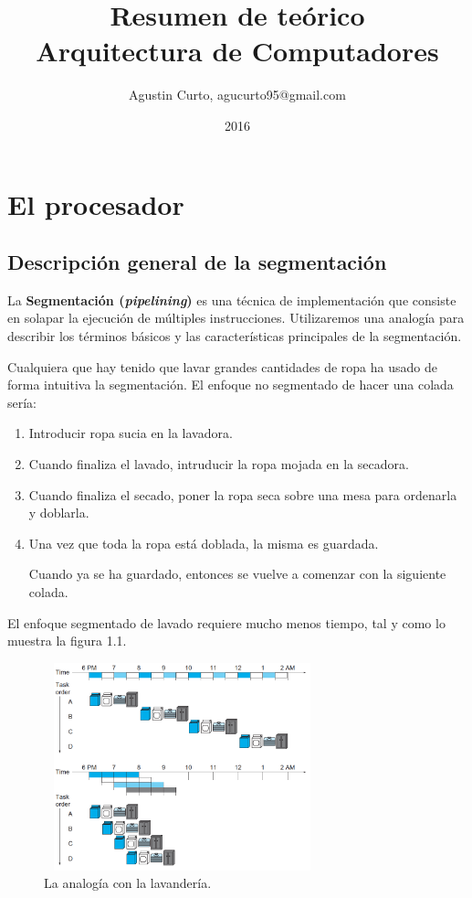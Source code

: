 \documentclass[12pt,a4paper]{report}
\author{Agustin Curto, agucurto95@gmail.com}
\title{Resumen de teórico \\ Arquitectura de Computadores}
\date{2016}
\begin{document}
\maketitle
\tableofcontents

\chapter{El procesador}
	\section{Descripción general de la segmentación}
		\par La \textbf{Segmentación (\textit{pipelining})} es una técnica de implementación que consiste en solapar la ejecución de múltiples instrucciones. Utilizaremos una analogía para describir los términos básicos y las características principales de la segmentación.
		\par Cualquiera que hay tenido que lavar grandes cantidades de ropa ha usado de forma intuitiva la segmentación. El enfoque no segmentado de hacer una colada sería:
		\begin{enumerate}
			\item Introducir ropa sucia en la lavadora.
			\item Cuando finaliza el lavado, intruducir la ropa mojada en la secadora.
			\item Cuando finaliza el secado, poner la ropa seca sobre una mesa para ordenarla y doblarla.
			\item Una vez que toda la ropa está doblada, la misma es guardada.
			\par Cuando ya se ha guardado, entonces se vuelve a comenzar con la siguiente colada.
		\end{enumerate}

		\par El enfoque segmentado de lavado requiere mucho menos tiempo, tal y como lo muestra la figura 1.1.

		\begin{figure}[htb]
			\centering
			\includegraphics[width=8cm, height=6cm]{./imagenes/lavanderia.png}
			\caption{La analogía con la lavandería.}
		\end{figure}
\end{document}
